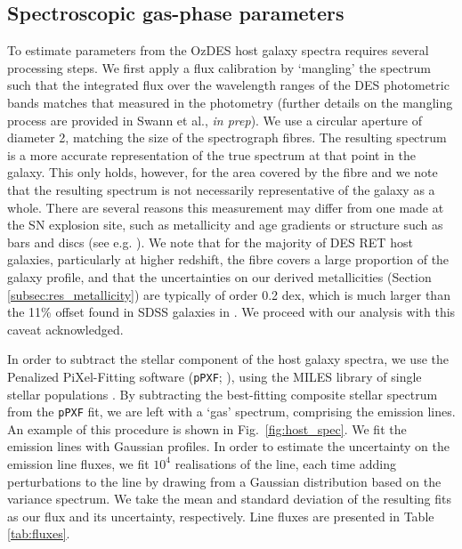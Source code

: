 \documentclass[fleqn,usenatbib,]{mnras}
\newcommand{\replyref}[1]{\color{magenta}#1 \color{black}}
\begin{document}
\subsection{Spectroscopic gas-phase parameters \label{subsec:linefit}}

To estimate parameters from the OzDES host galaxy spectra requires several processing steps. We first apply a flux calibration by `mangling' the spectrum such that the integrated flux over the wavelength ranges of the DES photometric bands matches that measured in the photometry (further details on the mangling process are provided in Swann et al., \textit{in prep}). We use a circular aperture of diameter 2\arcsec, matching the size of the spectrograph fibres. The resulting spectrum is a more accurate representation of the true spectrum at that point in the galaxy. This only holds, however, for the area covered by the fibre and we note that the resulting spectrum is not necessarily representative of the galaxy as a whole. There are several reasons this measurement may differ from one made at the SN explosion site, such as metallicity and age gradients or structure such as bars and discs (see e.g. \citealt{Iglesias-Paramo2013,Iglesias-Paramo2016}). \replyref{We note that for the majority of DES RET host galaxies, particularly at higher redshift, the fibre covers a large proportion of the galaxy profile, and that the uncertainties on our derived metallicities (Section \ref{subsec:res_metallicity}) are typically of order 0.2 dex, which is much larger than the 11\% offset found in SDSS galaxies in \citet{Iglesias-Paramo2016}}. We proceed with our analysis with this caveat acknowledged. 

In order to subtract the stellar component of the host galaxy spectra, we use the Penalized PiXel-Fitting software (\texttt{pPXF}; \citealt{Cappellari2004,Cappellari2012,Cappellari2017}), using the MILES library of single stellar populations \citep{Vazdekis2010}. By subtracting the best-fitting composite stellar spectrum from the \texttt{pPXF} fit, we are left with a `gas' spectrum, comprising the emission lines. An example of this procedure is shown in Fig.~\ref{fig:host_spec}. We fit the emission lines with Gaussian profiles. In order to estimate the uncertainty on the emission line fluxes, we fit $10^4$ realisations of the line, each time adding perturbations to the line by drawing from a Gaussian distribution based on the variance spectrum. We take the mean and standard deviation of the resulting fits as our flux and its uncertainty, respectively. Line fluxes are presented in Table \ref{tab:fluxes}.
\end{document}
